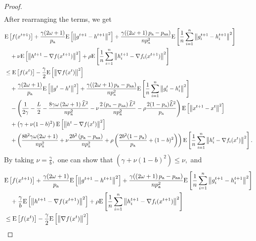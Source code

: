 \documentclass{article}
\newcommand*{\probavailable}{\ensuremath{p_{\textnormal{a}}}}
\newcommand*{\probpairaa}{\ensuremath{p_{\textnormal{aa}}}}
\begin{document}
\begin{proof}
\begin{align*}
    \end{align*}
    After rearranging the terms, we get
    \begin{align*}
      &\Exp{f(x^{t + 1})} + \frac{\gamma (2 \omega + 1)}{\probavailable} \Exp{\norm{g^{t+1} - h^{t+1}}^2} + \frac{\gamma (\left(2 \omega + 1\right)\probavailable - \probpairaa)}{n \probavailable^2} \Exp{\frac{1}{n}\sum_{i=1}^n\norm{g^{t+1}_i - h^{t+1}_i}^2}\\
      &\quad  + \nu \Exp{\norm{h^{t+1} - \nabla f(x^{t+1})}^2} + \rho \Exp{\frac{1}{n}\sum_{i=1}^n\norm{h^{t+1}_i - \nabla f_i(x^{t+1})}^2}\\
      &\leq \Exp{f(x^t)} - \frac{\gamma}{2}\Exp{\norm{\nabla f(x^t)}^2} \\
      &\quad + \frac{\gamma (2 \omega + 1)}{\probavailable} \Exp{\norm{g^{t} - h^{t}}^2} + \frac{\gamma (\left(2 \omega + 1\right)\probavailable - \probpairaa)}{n \probavailable^2} \Exp{\frac{1}{n}\sum_{i=1}^n\norm{g^{t}_i - h^{t}_i}^2} \\
      &\quad - \left(\frac{1}{2\gamma} - \frac{L}{2} - \frac{8 \gamma \omega \left(2 \omega + 1\right) \widehat{L}^2}{n \probavailable^2} - \nu \frac{2\left(\probavailable - \probpairaa\right)\widehat{L}^2}{n \probavailable^2} - \rho \frac{2(1 - \probavailable) \widehat{L}^2}{\probavailable} \right) \Exp{\norm{x^{t+1} - x^t}^2} \\
      &\quad + \left(\gamma + \nu (1 - b)^2\right) \Exp{\norm{h^{t} - \nabla f(x^{t})}^2} \\
      &\quad + \left(\frac{8 b^2 \gamma \omega (2 \omega + 1)}{n \probavailable^2} + \nu \frac{2 b^2 \left(\probavailable - \probpairaa\right)}{n \probavailable^2} + \rho \left(\frac{2 b^2 (1 - \probavailable)}{\probavailable} + (1 - b)^2\right) \right)\Exp{\frac{1}{n}\sum_{i=1}^n\norm{h^{t}_i - \nabla f_i(x^{t})}^2}.
    \end{align*}
    By taking $\nu = \frac{\gamma}{b},$ one can show that $\left(\gamma + \nu (1 - b)^2\right) \leq \nu,$ and
    \begin{align*}
      &\Exp{f(x^{t + 1})} + \frac{\gamma (2 \omega + 1)}{\probavailable} \Exp{\norm{g^{t+1} - h^{t+1}}^2} + \frac{\gamma (\left(2 \omega + 1\right)\probavailable - \probpairaa)}{n \probavailable^2} \Exp{\frac{1}{n}\sum_{i=1}^n\norm{g^{t+1}_i - h^{t+1}_i}^2}\\
      &\quad  + \frac{\gamma}{b} \Exp{\norm{h^{t+1} - \nabla f(x^{t+1})}^2} + \rho \Exp{\frac{1}{n}\sum_{i=1}^n\norm{h^{t+1}_i - \nabla f_i(x^{t+1})}^2}\\
      &\leq \Exp{f(x^t)} - \frac{\gamma}{2}\Exp{\norm{\nabla f(x^t)}^2} \\

\end{align*}
\end{proof}
\end{document}
